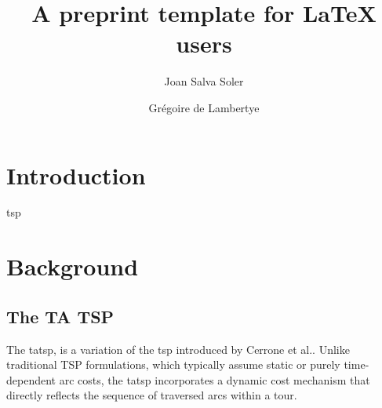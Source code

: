 \documentclass[twocolumn, switch]{article} %
\title{A preprint template for LaTeX users}
\author[1]{Joan Salva Soler\orcidA{}}
\author[2]{Grégoire de Lambertye\orcidB{}}
\affil[1]{H2O.ai}
\affil[2]{gregoire.delambertye@gmail.com}
\begin{document}



{}

\section{Introduction}
\lipsum[1]
\gls{tsp}

\section{Background}
\label{sec:background}

\subsection{The TA TSP}

The \gls{tatsp}, is a variation of the \gls{tsp} introduced by Cerrone et al.\cite{Cerrone}. 
Unlike traditional TSP formulations, which typically assume static or purely time-dependent arc costs, 
the \gls{tatsp} incorporates a dynamic cost mechanism that directly reflects the sequence of traversed arcs within a tour.
\end{document}
